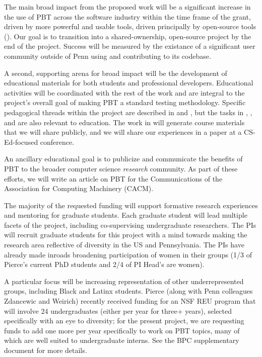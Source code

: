 {\smallskip
{} The main broad impact from the
proposed work will be a significant increase in the use of PBT across
the software industry within the time frame of the grant, driven
by more powerful and usable tools, driven principally by open-source
tools ().
Our goal is to
transition \tyche{} into a shared-ownership, open-source project
by the end of the project.
Success will be measured by the existance of a
significant user community outside of Penn using \tyche{} and
contributing to its codebase.

\smallskip
{}
%
A second, supporting arena for broad impact will be the
development of educational materials for both students and
professional developers. Educational activities will be
coordinated with the rest of the work and are integral to the
project's overall goal of making PBT a standard testing methodology.
Specific pedagogical
threads within the project are described in  and , but the
tasks in
,
, and
 are also relevant to education. The
work in  will generate course materials that we will
share publicly, and we will share our experiences in a paper at a
CS-Ed-focused conference.

An ancillary educational goal is to
publicize and communicate the benefits of PBT to the broader computer science
{\em research} community. As part of these efforts, we will write an article on PBT
for the Communications of the Association for Computing Machinery
(CACM).

\smallskip
{}
%
The majority of the requested funding will support formative research
experiences and mentoring for graduate students. Each graduate
student will lead multiple facets of the
project, including co-supervising undergraduate
researchers.
%
The PIs will recruit graduate students for this project with a mind towards making
the research area reflective of diversity in the US and Pennsylvania.
The PIs have already made inroads broadening participation of women in their
groups (1/3 of Pierce's current PhD students and 2/4 of PI
Head's are women).

A particular focus
will be increasing representation of
other underrepresented groups, including Black and Latinx
students. Pierce (along with Penn colleagues Zdancewic and Weirich)
recently received funding for an
NSF REU program that will involve 24 undergraduates (either per
year for three+ years), selected specifically with an eye to diversity;
for the present project, we are requesting funds to add one more per
year specifically to work on PBT topics, many of which are well suited
to undergraduate interns. See the BPC
supplementary
document for more details.

}
